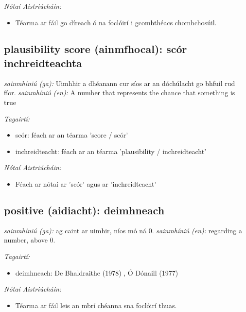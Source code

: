 \documentclass{article}
\begin{document}
 \noindent \textit{Nótaí Aistriúcháin:}
\begin{itemize}
	\item Téarma ar fáil go díreach ó na foclóirí i gcomhthéacs chomhchosúil.
\end{itemize}


\subsection*{plausibility score (ainmfhocal): scór inchreidteachta} 
 \noindent \textit{sainmhíniú (ga):} Uimhhir a dhéanann cur síos ar an dóchúlacht go bhfuil rud fíor.
\newline\newline
 \noindent \textit{sainmhíniú (en):} A number that represents the chance that something is true
\newline

 \noindent \textit{Tagairtí:}
\begin{itemize}
	\item scór: féach ar an téarma 'score / scór'
	\item inchreidteacht: féach ar an téarma 'plausibility / inchreidteacht'
\end{itemize}

 \noindent \textit{Nótaí Aistriúcháin:}
\begin{itemize}
	\item Féach ar nótaí ar 'scór' agus ar 'inchreidteacht'
\end{itemize}


\subsection*{positive (aidiacht): deimhneach} 
 \noindent \textit{sainmhíniú (ga):} ag caint ar uimhir, níos mó ná 0.
\newline\newline
 \noindent \textit{sainmhíniú (en):} regarding a number, above 0.
\newline

 \noindent \textit{Tagairtí:}
\begin{itemize}
	\item deimhneach: De Bhaldraithe (1978) \cite{de-bhaldraithe}, Ó Dónaill (1977) \cite{odonaill}
\end{itemize}

 \noindent \textit{Nótaí Aistriúcháin:}
\begin{itemize}
	\item Téarma ar fáil leis an mbrí chéanna sna foclóirí thuas.
\end{itemize}
\end{document}
